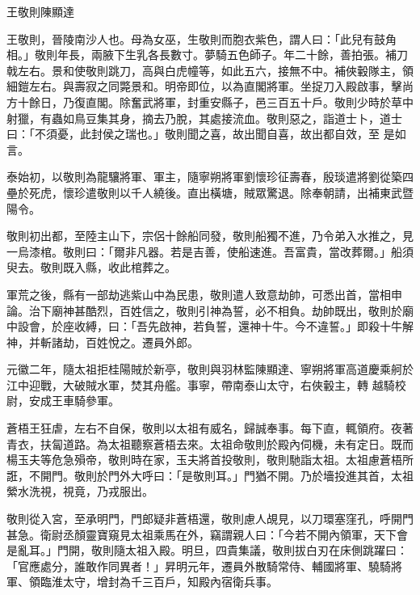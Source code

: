 
\begin{pinyinscope}

 王敬則陳顯達



 王敬則，晉陵南沙人也。母為女巫，生敬則而胞衣紫色，謂人曰：「此兒有鼓角相。」敬則年長，兩腋下生乳各長數寸。夢騎五色師子。年二十餘，善拍張。補刀戟左右。景和使敬則跳刀，高與白虎幢等，如此五六，接無不中。補俠轂隊主，領細鎧左右。與壽寂之同斃景和。明帝即位，以為直閣將軍。坐捉刀入殿啟事，擊尚方十餘日，乃復直閣。除奮武將軍，封重安縣子，邑三百五十戶。敬則少時於草中射獵，有蟲如鳥豆集其身，摘去乃脫，其處接流血。敬則惡之，詣道士卜，道士曰：「不須憂，此封侯之瑞也。」敬則聞之喜，故出聞自喜，故出都自效，至
 是如言。



 泰始初，以敬則為龍驤將軍、軍主，隨寧朔將軍劉懷珍征壽春，殷琰遣將劉從築四壘於死虎，懷珍遣敬則以千人繞後。直出橫塘，賊眾驚退。除奉朝請，出補東武暨陽令。



 敬則初出都，至陸主山下，宗侶十餘船同發，敬則船獨不進，乃令弟入水推之，見一烏漆棺。敬則曰：「爾非凡器。若是吉善，使船速進。吾富貴，當改葬爾。」船須臾去。敬則既入縣，收此棺葬之。



 軍荒之後，縣有一部劫逃紫山中為民患，敬則遣人致意劫帥，可悉出首，當相申論。治下廟神甚酷烈，百姓信之，敬則引神為誓，必不相負。劫帥既出，敬則於廟中設會，於座收縛，曰：「吾先啟神，若負誓，還神十牛。今不違誓。」即殺十牛解神，并斬諸劫，百姓悅之。遷員外郎。



 元徽二年，隨太祖拒桂陽賊於新亭，敬則與羽林監陳顯達、寧朔將軍高道慶乘舸於江中迎戰，大破賊水軍，焚其舟艦。事寧，帶南泰山太守，右俠轂主，轉
 越騎校尉，安成王車騎參軍。



 蒼梧王狂虐，左右不自保，敬則以太祖有威名，歸誠奉事。每下直，輒領府。夜著青衣，扶匐道路。為太祖聽察蒼梧去來。太祖命敬則於殿內伺機，未有定日。既而楊玉夫等危急殞帝，敬則時在家，玉夫將首投敬則，敬則馳詣太祖。太祖慮蒼梧所誑，不開門。敬則於門外大呼曰：「是敬則耳。」門猶不開。乃於墻投進其首，太祖縈水洗視，視竟，乃戎服出。



 敬則從入宮，至承明門，門郎疑非蒼梧還，敬則慮人覘見，以刀環塞窪孔，呼開門甚急。衛尉丞顏靈寶窺見太祖乘馬在外，竊謂親人曰：「今若不開內領軍，天下會是亂耳。」門開，敬則隨太祖入殿。明旦，四貴集議，敬則拔白刃在床側跳躍曰：「官應處分，誰敢作同異者！」昇明元年，遷員外散騎常侍、輔國將軍、驍騎將軍、領臨淮太守，增封為千三百戶，知殿內宿衛兵事。




\end{pinyinscope}
